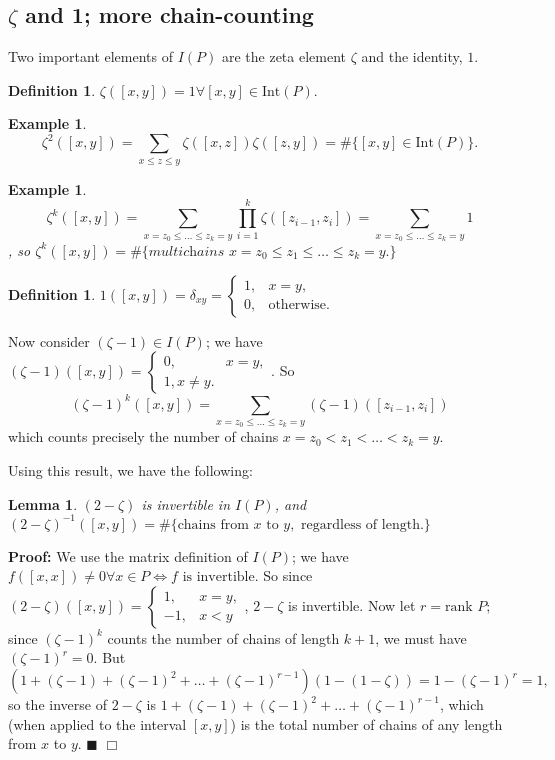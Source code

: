 \documentclass[11pt]{article}
\newtheorem{lemma}[theorem]{Lemma}
\newtheorem{definition}[theorem]{Definition}
\newtheorem{example}[theorem]{Example}
\newenvironment{proof}{\noindent \textbf{Proof:}}{$\Box$}
\newcommand{\inter}[1]{\textrm{Int}({#1})} %
\begin{document}
\subsection{$\zeta$ and 1; more chain-counting}

Two important elements of $I(P)$ are the zeta element $\zeta$ and the identity, $1$. 

\begin{definition} $\zeta([x,y]) = 1 \forall [x,y] \in \inter{P}.$ \end{definition}

\begin{example} $$\zeta^2([x,y]) = \sum_{x \le z \le y} \zeta([x,z]) \zeta([z,y]) = \#\{[x,y] \in \inter{P}\}.$$ \end{example}

\begin{example} $$\zeta^k([x,y]) = \sum_{x = z_0 \le \ldots \le z_k = y} \prod_{i=1}^{k} \zeta([z_{i-1}, z_i]) = \sum_{x = z_0 \le \ldots \le z_k = y} 1$$, so $\zeta^k([x,y]) = \#\{\textit{multichains } x = z_0 \le z_1 \le \ldots \le z_k = y.\}$ \end{example}

\begin{definition} $1([x,y]) = \delta_{xy} = \begin{cases} 1, & x=y, \\ 0, &\textrm{otherwise}. \end{cases}$ \end{definition}

Now consider $(\zeta-1) \in I(P)$; we have $(\zeta-1)([x,y]) = \begin{cases} 0, & x=y, \\ 1, x \neq y.\end{cases}$. So $$(\zeta-1)^k([x,y]) = \sum_{x = z_0 \le \ldots \le z_k = y} (\zeta-1)([z_{i-1}, z_i])$$ which counts precisely the number of chains $x = z_0 < z_1 < \ldots < z_k = y$.

Using this result, we have the following:

\begin{lemma} $(2-\zeta)$ is invertible in $I(P)$, and $(2-\zeta)^{-1}([x,y]) = \#\{\textrm{chains from } x \textrm{ to } y, \textrm{ regardless of length.} \}$ \end{lemma}

\begin{proof}
We use the matrix definition of $I(P)$; we have $f([x,x]) \neq 0 \forall x \in P \Leftrightarrow f \textrm{ is invertible}$. So since $(2-\zeta)([x,y]) = \begin{cases} 1, & x=y, \\ -1, & x<y \end{cases}$, $2-\zeta$ is invertible. Now let $r = \textrm{rank } P$; since $(\zeta-1)^k$ counts the number of chains of length $k+1$, we must have $(\zeta-1)^{r} = 0$. But 
$$\left(1+(\zeta-1)+(\zeta-1)^2 + \ldots + (\zeta-1)^{r-1}\right)(1-(1-\zeta)) = 1 - (\zeta-1)^r = 1,$$
so the inverse of $2-\zeta$ is $1+(\zeta-1)+(\zeta-1)^2+ \ldots + (\zeta-1)^{r-1}$, which (when applied to the interval $[x,y]$) is the total number of chains of any length from $x$ to $y$. $\blacksquare$
\end{proof}
\end{document}
